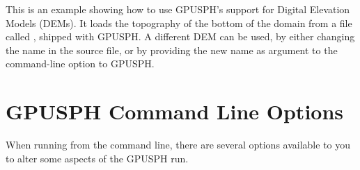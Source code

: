 \documentclass{../GPUSPHtemplate}
\begin{document}
This is an example showing how to use GPUSPH's support for Digital
Elevation Models (DEMs). It loads the topography of the bottom of the
domain from a file called , shipped with GPUSPH.
A different DEM can be used, by either changing the name in the source
 file, or by providing the new name as argument to the
 command-line option to GPUSPH.


\section{GPUSPH Command Line Options}\label{options}

When running from the command line, there are several options available
to you to alter some aspects of the GPUSPH run.
\end{document}
